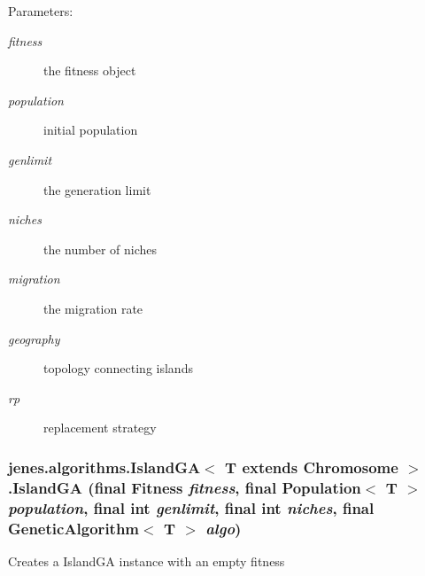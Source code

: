 \begin{Desc}
\item[Parameters:]
\begin{description}
\item[{\em fitness}]the fitness object \item[{\em population}]initial population \item[{\em genlimit}]the generation limit \item[{\em niches}]the number of niches \item[{\em migration}]the migration rate \item[{\em geography}]topology connecting islands \item[{\em rp}]replacement strategy \end{description}
\end{Desc}
\hypertarget{classjenes_1_1algorithms_1_1_island_g_a_3_01_t_01extends_01_chromosome_01_4_1347ad1ffe4f878c6f92d4a12484f174}{
\subsubsection[IslandGA]{\setlength{\rightskip}{0pt plus 5cm}jenes.algorithms.IslandGA$<$ T extends Chromosome $>$.IslandGA (final Fitness {\em fitness}, \/  final Population$<$ T $>$ {\em population}, \/  final int {\em genlimit}, \/  final int {\em niches}, \/  final GeneticAlgorithm$<$ T $>$ {\em algo})}}
\label{classjenes_1_1algorithms_1_1_island_g_a_3_01_t_01extends_01_chromosome_01_4_1347ad1ffe4f878c6f92d4a12484f174}


Creates a IslandGA instance with an empty fitness

